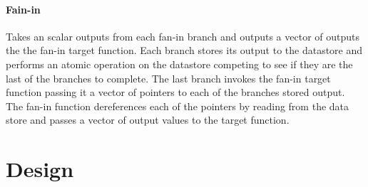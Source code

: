 \paragraph{Fain-in}
Takes an scalar outputs from each fan-in branch and outputs a vector of
outputs the the fan-in target function. Each branch stores its output to the
datastore and performs an atomic operation on the datastore competing to see if
they are the last of the branches to complete. The last branch invokes the
fan-in target function passing it a vector of pointers to each of the branches
stored output. The fan-in function dereferences each of the pointers by reading
from the data store and passes a vector of output values to the target function.


\section{Design}\label{sec:design}

%
%

